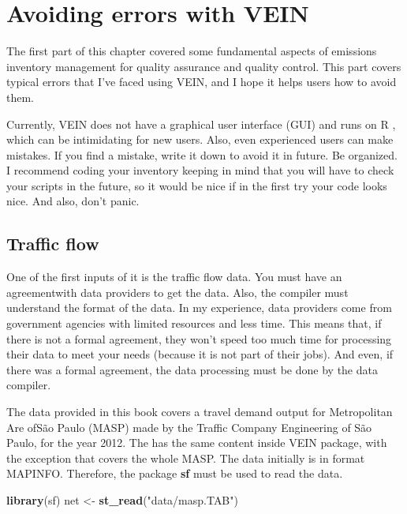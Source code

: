 \documentclass[12pt,graybox,envcountchap,sectrefs]{krantz}
\makeatletter
\newenvironment{Shaded}{\begin{snugshade}}{\end{snugshade}}
\newcommand{\KeywordTok}[1]{\textcolor[rgb]{0.13,0.29,0.53}{\textbf{#1}}}
\newcommand{\StringTok}[1]{\textcolor[rgb]{0.31,0.60,0.02}{#1}}
\newcommand{\NormalTok}[1]{#1}
\newenvironment{kframe}{%
\medskip{}
\setlength{\fboxsep}{.8em}
 \def\at@end@of@kframe{}%
 \ifinner\ifhmode%
  \def\at@end@of@kframe{\end{minipage}}%
  \begin{minipage}{\columnwidth}%
 \fi\fi%
 \def\FrameCommand##1{\hskip\@totalleftmargin \hskip-\fboxsep
 \colorbox{shadecolor}{##1}\hskip-\fboxsep
     \hskip-\linewidth \hskip-\@totalleftmargin \hskip\columnwidth}%
 \MakeFramed {\advance\hsize-\width
   \@totalleftmargin\z@ \linewidth\hsize
   \@setminipage}}%
 {\par\unskip\endMakeFramed%
 \at@end@of@kframe}
\renewenvironment{Shaded}{\begin{kframe}}{\end{kframe}}
\theoremstyle{definition}
\theoremstyle{definition}
\theoremstyle{definition}
\theoremstyle{remark}
\makeatother
\begin{document}
\section{Avoiding errors with VEIN}\label{avoiding-errors-with-vein}

The first part of this chapter covered some fundamental aspects of
emissions inventory management for quality assurance and quality
control. This part covers typical errors that I've faced using VEIN, and
I hope it helps users how to avoid them.

Currently, VEIN does not have a graphical user interface (GUI) and runs
on R \citep{R}, which can be intimidating for new users. Also, even
experienced users can make mistakes. If you find a mistake, write it
down to avoid it in future. Be organized. I recommend coding your
inventory keeping in mind that you will have to check your scripts in
the future, so it would be nice if in the first try your code looks
nice. And also, don't panic.

\subsection{Traffic flow}\label{traffic-flow}

One of the first inputs of it is the traffic flow data. You must have an
agreementwith data providers to get the data. Also, the compiler must
understand the format of the data. In my experience, data providers come
from government agencies with limited resources and less time. This
means that, if there is not a formal agreement, they won't speed too
much time for processing their data to meet your needs (because it is
not part of their jobs). And even, if there was a formal agreement, the
data processing must be done by the data compiler.

The data provided in this book covers a travel demand output for
Metropolitan Are ofSão Paulo (MASP) made by the Traffic Company
Engineering of São Paulo, for the year 2012. The has the same content
inside VEIN package, with the exception that covers the whole MASP. The
data initially is in format MAPINFO. Therefore, the package \textbf{sf}
must be used to read the data.

\begin{Shaded}
\begin{Highlighting}[]
\KeywordTok{library}\NormalTok{(sf)}
\NormalTok{net <-}\StringTok{ }\KeywordTok{st_read}\NormalTok{(}\StringTok{"data/masp.TAB"}\NormalTok{)}
\end{Highlighting}
\end{Shaded}
\end{document}
